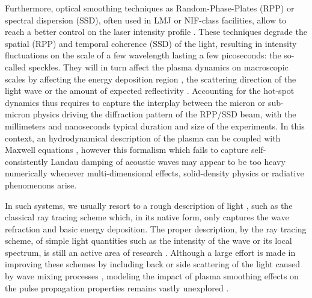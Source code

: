 \documentclass[%
 reprint,
 amsmath,amssymb,
 aps,
]{revtex4-1}
\begin{document}
Furthermore, optical smoothing techniques as Random-Phase-Plates (RPP) or  spectral dispersion (SSD), often used in LMJ or NIF-class facilities, allow to reach a better control on the laser intensity profile \cite{Kato_1984,Skupski_1989}.
These techniques  degrade the spatial (RPP) and temporal coherence (SSD) of the  light,  resulting in intensity fluctuations on the scale of a few wavelength lasting a few picoseconds: the so-called speckles. 
They will in turn affect the plasma dynamics on macroscopic scales by affecting the energy deposition region  \cite[]{POP_Delamater_1996,Huser_2009}, the scattering direction  of the light wave \cite{Epstein_1986,PRL_Moody_96,POP_Debayle_2018,POP_Duluc_2019,Yin_2019,POP_Huller_2020} or the amount of expected reflectivity \cite[]{POP_Laffite_2010,PRL_Rousseaux_2016,POP_Masson_2016,Glize_2017,Winjum_2019}. Accounting for the hot-spot dynamics thus requires to capture the interplay between the micron or  sub-micron physics driving the   diffraction pattern of the RPP/SSD beam, with the millimeters and nanoseconds typical duration and size of the experiments. 
In this context, an hydrodynamical description of the plasma can be coupled with Maxwell equations \cite{Berger_1995,Still_2006,Loiseau_2006, Huller_2006}, however this formalism which fails to capture self-consistently Landau damping of acoustic waves may appear to be  too heavy numerically whenever  multi-dimensional effects,  solid-density physics or radiative phenomenons arise.

In such systems, we usually resort to a rough description of light \cite[]{POP_Zhang_2014,Lefebvre_2018},  such as the classical ray tracing scheme which, in its native form, only captures the wave refraction and basic energy deposition.
The proper description, by the ray tracing scheme,  of simple  light quantities  such as the intensity  of the wave or its local spectrum, is still an active area of research  \cite{Egorchenkov_2001, Colaitis_2014, Strozzi_2017}.
Although a large effort is made in improving these schemes by including back or side scattering of the light caused by wave mixing processes \cite[]{Strozzi_2017,POP_Debayle_2019},  
modeling the impact of plasma smoothing effects on the pulse propagation properties remains vastly unexplored \cite[]{POF_Anderson,POP_Still_2000,POP_Grech_2006,PRL_Grech_2009}.
 
\end{document}
